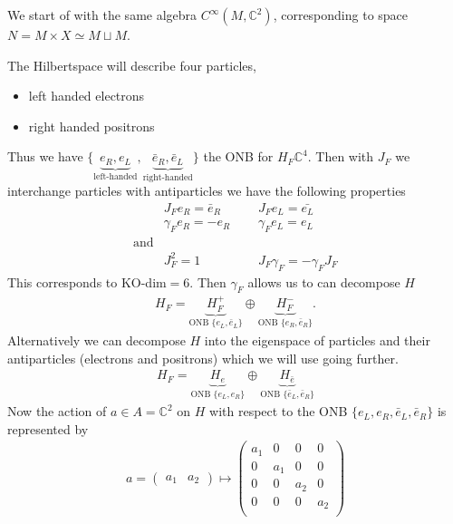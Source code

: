 \documentclass[a4paper]{article}
\theoremstyle{definition}
\theoremstyle{definition}
\theoremstyle{definition}
\theoremstyle{theorem}
\theoremstyle{theorem}
\theoremstyle{theorem}
\begin{document}
We start of with the same algebra $C^\infty(M, \mathbb{C}^2)$, corresponding
to space $N= M\times X \simeq M\sqcup M$.
\newline

The Hilbertspace will describe four particles,
\begin{itemize}
    \item left handed electrons
    \item right handed positrons
\end{itemize}
Thus we have $\{ \underbrace{e_R, e_L}_{\text{left-handed}},
\underbrace{\bar{e}_R, \bar{e}_L}_{\text{right-handed}}\}$ the ONB for $H_F
\mathbb{C}^4$.
\newline
Then with $J_F$ we interchange particles with antiparticles we have the
following properties
\begin{align}
    &J_F e_R = \bar{e}_R \;\;\;\;\; &J_F e_L = \bar{e_L} \\
    &\gamma _F e_R = -e_R \;\;\;\;\; &\gamma_F e_L = e_L \\
    \text{and}& \nonumber \\
    &J_F^2 = 1 \;\;\;\;\; & J_F \gamma_F  = - \gamma_F J_F
\end{align}
This corresponds to KO-dim$= 6$. Then $\gamma_F$ allows us to can decompose
$H$
\begin{align}
    H_F = \underbrace{H_F^+}_{\text{ONB } \{e_L, \bar{e}_L\}}
    \oplus \underbrace{H_F^-}_{\text{ONB } \{e_R, \bar{e}_R\}}.
\end{align}
Alternatively we can decompose $H$ into the eigenspace of particles and their
antiparticles (electrons and positrons) which we will use going further.
\begin{align}
    H_F = \underbrace{H_{e}}_{\text{ONB } \{e_L, e_R\}} \oplus
    \underbrace{H_{\bar{e}}}_{\text{ONB } \{\bar{e}_L, \bar{e}_R\}}
\end{align}
Now the action of $a \in A = \mathbb{C}^2$ on $H$ with respect to the ONB
$\{e_L, e_R, \bar{e}_L, \bar{e}_R\}$ is represented by
\begin{align}
    a =
    \begin{pmatrix}a_1 & a_2 \end{pmatrix} \mapsto
        \begin{pmatrix}
            a_1 &0 &0 &0\\
             0&a_1 &0 &0\\
            0 &0 &a_2 &0\\
            0 &0 &0 &a_2\\
        \end{pmatrix}
\end{align}
\end{document}
